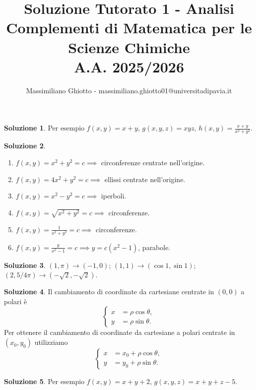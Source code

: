 \documentclass[12pt,a4paper]{article}
\title{Soluzione Tutorato 1 - Analisi \\Complementi di Matematica per le Scienze Chimiche\\ A.A. 2025/2026}
\author{Massimiliano Ghiotto - massimiliano.ghiotto01@universitadipavia.it}
\date{}
\theoremstyle{definition}
\newtheorem{sol}{Soluzione}
\begin{document}
\maketitle

\begin{sol}
    Per esempio $f(x,y) = x+y$, $g(x,y,z) = xyz$, $h(x,y) = \frac{x+y}{x^2+y^2}$.
\end{sol}

\begin{sol}
    \begin{enumerate}
        \item $f(x,y) = x^2+y^2=c \implies$ circonferenze centrate nell'origine.
        \item $f(x,y) = 4x^2+y^2=c \implies$ ellissi centrate nell'origine.
        \item $f(x,y) = x^2-y^2=c \implies$ iperboli.
        \item $f(x,y) = \sqrt{x^2+y^2}=c \implies$ circonferenze.
        \item $f(x,y) = \frac{1}{x^2+y^2}=c \implies$ circonferenze.
        \item $f(x,y) = \frac{y}{x^2-1}=c \implies y = c(x^2-1)$, parabole.
    \end{enumerate}
\end{sol}

\begin{sol}
    $(1, \pi) \to (-1, 0)$; $(1,1) \to (\cos 1, \sin 1)$; $(2, 5/4 \pi) \to (-\sqrt{2}, -\sqrt{2})$.
\end{sol}

\begin{sol}
    Il cambiamento di coordinate da cartesiane centrate in $(0,0)$ a polari è
    \[\begin{cases}
            x & = \rho \cos \theta, \\ y & = \rho \sin \theta.
        \end{cases}\]
    Per ottenere il cambiamento di coordinate da cartesiane a polari centrate in $(x_0, y_0)$ utilizziamo
    \[\begin{cases}
            x & = x_0 + \rho \cos \theta, \\ y & = y_0 + \rho \sin \theta.
        \end{cases}\]
\end{sol}

\begin{sol}
    Per esempio $f(x,y) = x+y+2$, $g(x,y,z) = x+y+z-5$.
\end{sol}
\end{document}
